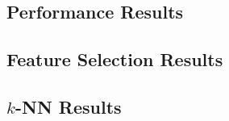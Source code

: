 \subsection{Performance Results}













\clearpage
\subsection{Feature Selection Results}
\label{app:features-pt}









\clearpage
\subsection{$k$-NN Results}




